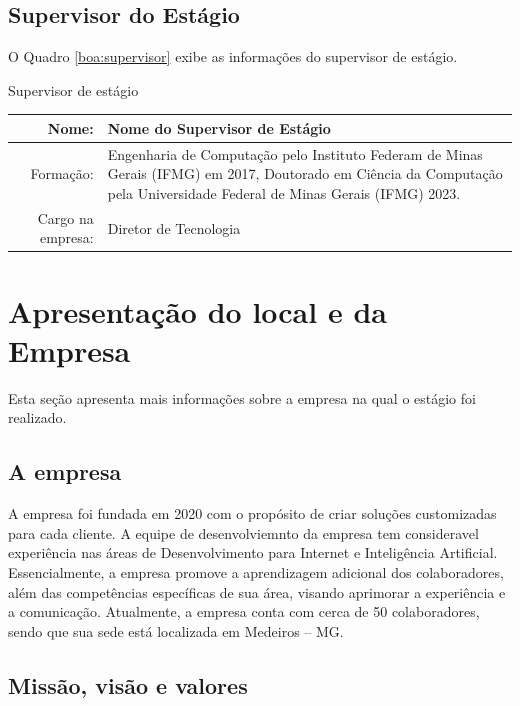 \documentclass[estagio]{iftex2024}
\begin{document}
\subsection{Supervisor do Estágio}

O Quadro \ref{boa:supervisor} exibe as informações do supervisor de estágio.

\begin{board}[!htb] \centering
\caption{Supervisor de estágio} \label{boa:supervisor}
\begin{varwidth}{\linewidth}
  \begin{tabularx}{\linewidth}{|r|X|} \hline
  Nome:             & Nome do Supervisor de Estágio \\ \hline
  Formação:         & Engenharia de Computação pelo Instituto Federam de Minas Gerais (IFMG) em 2017, Doutorado em Ciência da Computação pela Universidade Federal de Minas Gerais (IFMG) 2023. \\ \hline
  Cargo na empresa: & Diretor de Tecnologia   \\ \hline
  \end{tabularx}
\end{varwidth}
\end{board}


\section{Apresentação do local e da Empresa} \label{sec:apresentacao}

Esta seção apresenta mais informações sobre a empresa na qual o estágio foi realizado.

\subsection{A empresa} \label{subsec:empresa}

A empresa {\theEmpresa} foi fundada em 2020 com o propósito de criar soluções customizadas para cada cliente.
A equipe de desenvolviemnto da empresa tem consideravel experiência nas áreas de Desenvolvimento para Internet e Inteligência Artificial.
Essencialmente, a empresa promove a aprendizagem adicional dos colaboradores, além das competências específicas de sua área, visando aprimorar a experiência e a comunicação.
Atualmente, a empresa conta com cerca de 50 colaboradores, sendo que sua sede está localizada em Medeiros -- MG.

\subsection{Missão, visão e valores}
\end{document}
